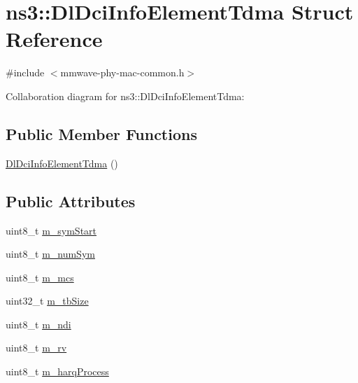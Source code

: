 \hypertarget{structns3_1_1DlDciInfoElementTdma}{}\section{ns3\+:\+:Dl\+Dci\+Info\+Element\+Tdma Struct Reference}
\label{structns3_1_1DlDciInfoElementTdma}


{\ttfamily \#include $<$mmwave-\/phy-\/mac-\/common.\+h$>$}



Collaboration diagram for ns3\+:\+:Dl\+Dci\+Info\+Element\+Tdma\+:
\subsection*{Public Member Functions}
\begin{DoxyCompactItemize}
\item 
\hyperlink{structns3_1_1DlDciInfoElementTdma_a3fd248357eca26d008a55ce3b7e30bfd}{Dl\+Dci\+Info\+Element\+Tdma} ()
\end{DoxyCompactItemize}
\subsection*{Public Attributes}
\begin{DoxyCompactItemize}
\item 
uint8\+\_\+t \hyperlink{structns3_1_1DlDciInfoElementTdma_a86d3cacb313ce812a68834293941540e}{m\+\_\+sym\+Start}
\item 
uint8\+\_\+t \hyperlink{structns3_1_1DlDciInfoElementTdma_ad2ca3b15c1b18ef93a648722be168bf1}{m\+\_\+num\+Sym}
\item 
uint8\+\_\+t \hyperlink{structns3_1_1DlDciInfoElementTdma_a5cf978f8499fb28fe0e5368bc2c7a78b}{m\+\_\+mcs}
\item 
uint32\+\_\+t \hyperlink{structns3_1_1DlDciInfoElementTdma_a74b7e4b7737d4b10d2a23720fb59dae3}{m\+\_\+tb\+Size}
\item 
uint8\+\_\+t \hyperlink{structns3_1_1DlDciInfoElementTdma_a437727a76de1539d92435c6e5fa28df4}{m\+\_\+ndi}
\item 
uint8\+\_\+t \hyperlink{structns3_1_1DlDciInfoElementTdma_a32b2f33e9c7852b48215ca00a4d71021}{m\+\_\+rv}
\item 
uint8\+\_\+t \hyperlink{structns3_1_1DlDciInfoElementTdma_a0233188a4cf47557d30afa8e9c7ecb98}{m\+\_\+harq\+Process}
\end{DoxyCompactItemize}



